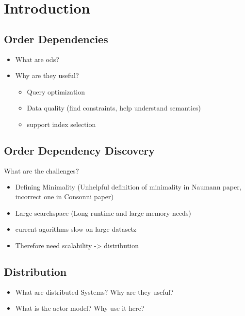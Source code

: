 
\section{Introduction}\label{sec:intro}
\subsection{Order Dependencies}
\begin{itemize}
	\item What are \glspl{od}?
	\item Why are they useful?
	\begin{itemize}
		\item Query optimization
		\item Data quality (find constraints, help understand semantics)
		\item support index selection
	\end{itemize}
\end{itemize}	

\subsection{Order Dependency Discovery}
What are the challenges? 
\begin{itemize}
	\item Defining Minimality (Unhelpful definition of minimality in Naumann paper, incorrect one in Consonni paper)	
	\item Large searchspace (Long runtime and large memory-needs)
	\item current agorithms slow on large datasetz 
	\item Therefore need scalability -> distribution
\end{itemize}

\subsection{Distribution}
\begin{itemize}
	\item What are distributed Systems? Why are they useful?
	\item What is the actor model? Why use it here?	
\end{itemize}

